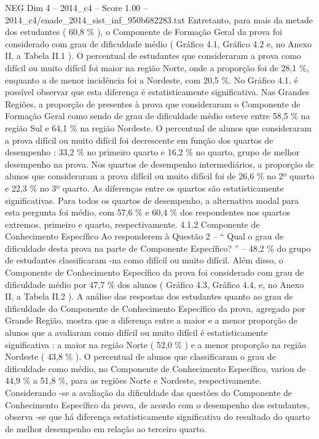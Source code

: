 \begin{textsample}{NEG Dim 4 – 2014\_c4 – Score 1.00 – 2014\_c4/enade\_2014\_sist\_inf\_950b682283.txt}
Entretanto, para mais da metade dos estudantes ( 60,8 \% ), o Componente de Formação Geral da prova foi considerado com grau de dificuldade médio ( Gráfico 4.1, Gráfico 4.2 e, no Anexo II, a Tabela II.1 ).
O percentual de estudantes que consideraram a prova como difícil ou muito difícil foi maior na região Norte, onde a proporção foi de 28,1 \%, enquanto a de menor incidência foi a Nordeste, com 20,5 \%.
No Gráfico 4.1, é possível observar que esta diferença é estatisticamente significativa.
Nas Grandes Regiões, a proporção de presentes à prova que consideraram o Componente de Formação Geral como sendo de grau de dificuldade médio esteve entre 58,5 \% na região Sul e 64,1 \% na região Nordeste.
O percentual de alunos que consideraram a prova difícil ou muito difícil foi decrescente em função dos quartos de desempenho : 33,2 \% no primeiro quarto e 16,2 \% no quarto, grupo de melhor desempenho na prova.
Nos quartos de desempenho intermediários, a proporção de alunos que consideraram a prova difícil ou muito difícil foi de 26,6 \% no 2º quarto e 22,3 \% no 3º quarto.
As diferenças entre os quartos são estatisticamente significativas.
Para todos os quartos de desempenho, a alternativa modal para esta pergunta foi médio, com 57,6 \% e 60,4 \% dos respondentes nos quartos extremos, primeiro e quarto, respectivamente. 4.1.2 Componente de Conhecimento Específico Ao responderem à Questão 2 – “ Qual o grau de dificuldade desta prova na parte de Componente Específico? ” – 48,2 \% do grupo de estudantes classificaram -na como difícil ou muito difícil.
Além disso, o Componente de Conhecimento Específico da prova foi considerado com grau de dificuldade médio por 47,7 \% dos alunos ( Gráfico 4.3, Gráfico 4.4, e, no Anexo II, a Tabela II.2 ).
A análise das respostas dos estudantes quanto ao grau de dificuldade do Componente de Conhecimento Específico da prova, agregado por Grande Região, mostra que a diferença entre a maior e a menor proporção de alunos que a avaliaram como difícil ou muito difícil é estatisticamente significativa : a maior na região Norte ( 52,0 \% ) e a menor proporção na região Nordeste ( 43,8 \% ).
O percentual de alunos que classificaram o grau de dificuldade como médio, no Componente de Conhecimento Específico, variou de 44,9 \% a 51,8 \%, para as regiões Norte e Nordeste, respectivamente.
Considerando -se a avaliação da dificuldade das questões do Componente de Conhecimento Específico da prova, de acordo com o desempenho dos estudantes, observa -se que há diferença estatisticamente significativa do resultado do quarto de melhor desempenho em relação ao terceiro quarto.

\end{textsample}
